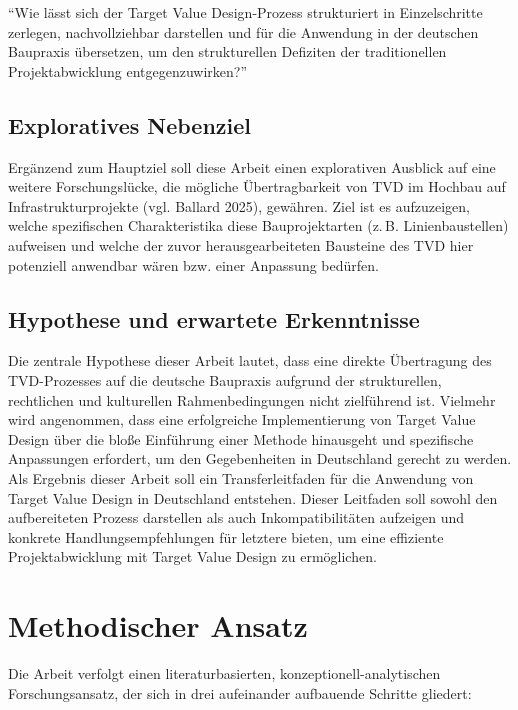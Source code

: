 \enquote{Wie lässt sich der Target Value Design-Prozess strukturiert in Einzelschritte zerlegen, nachvollziehbar darstellen und für die Anwendung in der deutschen Baupraxis übersetzen, um den strukturellen Defiziten der traditionellen Projektabwicklung entgegenzuwirken?}

\subsection{Exploratives Nebenziel}
Ergänzend zum Hauptziel soll diese Arbeit einen explorativen Ausblick auf eine weitere Forschungslücke, die mögliche Übertragbarkeit von TVD im Hochbau auf Infrastrukturprojekte \autocite [S.45]{ballard2025} (vgl. Ballard 2025), gewähren. Ziel ist es aufzuzeigen, welche spezifischen Charakteristika diese Bauprojektarten (z.\,B. Linienbaustellen) aufweisen und welche der zuvor herausgearbeiteten Bausteine des TVD hier potenziell anwendbar wären bzw. einer Anpassung bedürfen.

\subsection{Hypothese und erwartete Erkenntnisse}
Die zentrale Hypothese dieser Arbeit lautet, dass eine direkte Übertragung des TVD-Prozesses auf die deutsche Baupraxis aufgrund der strukturellen, rechtlichen und kulturellen Rahmenbedingungen nicht zielführend ist. Vielmehr wird angenommen, dass eine erfolgreiche Implementierung von Target Value Design über die bloße Einführung einer Methode hinausgeht und spezifische Anpassungen erfordert, um den Gegebenheiten in Deutschland gerecht zu werden.
Als Ergebnis dieser Arbeit soll ein Transferleitfaden für die Anwendung von Target Value Design in Deutschland entstehen. Dieser Leitfaden soll sowohl den aufbereiteten Prozess darstellen als auch Inkompatibilitäten aufzeigen und konkrete Handlungsempfehlungen für letztere bieten, um eine effiziente Projektabwicklung mit Target Value Design zu ermöglichen.

\section{Methodischer Ansatz}
\label{sec:methodischer-ansatz}

Die Arbeit verfolgt einen literaturbasierten, konzeptionell-analytischen Forschungsansatz, der sich in drei aufeinander aufbauende Schritte gliedert:

